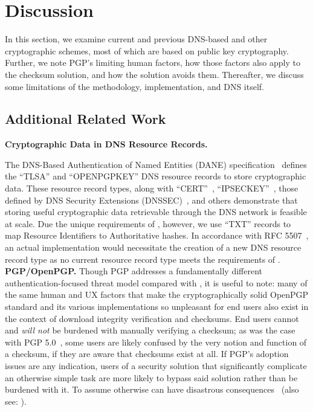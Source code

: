 \section{Discussion} \label{sec:discussion}

In this section, we examine current and previous DNS-based and other
cryptographic schemes, most of which are based on public key cryptography.
Further, we note PGP's limiting human factors, how those factors also apply to
the checksum solution, and how the \SYSTEM{} solution avoids them. Thereafter,
we discuss some limitations of the \SYSTEM{} methodology, implementation, and
DNS itself.

\subsection{Additional Related Work}

\noindent\textbf{Cryptographic Data in DNS Resource Records.}

The DNS-Based Authentication of Named Entities (DANE) specification~\cite{DANE1,
DANE2, DANE3} defines the ``TLSA'' and ``OPENPGPKEY'' DNS resource records to
store cryptographic data. These resource record types, along with
``CERT''~\cite{CERT}, ``IPSECKEY''~\cite{IPSECKEY}, those defined by DNS
Security Extensions (DNSSEC)~\cite{DNSSEC}, and others demonstrate that storing
useful cryptographic data retrievable through the DNS network is feasible at
scale. Due the unique requirements of \SYSTEM{}, however, we use ``TXT'' records
to map Resource Identifiers to Authoritative hashes. In accordance with RFC
5507~\cite{RFC5507}, an actual \SYSTEM{} implementation would necessitate the
creation of a new DNS resource record type as no current resource record type
meets the requirements of \SYSTEM{}. \\

\noindent\textbf{PGP/OpenPGP.} Though PGP addresses a fundamentally different
authentication-focused threat model compared with \SYSTEM{}, it is useful to
note: many of the same human and UX factors that make the cryptographically
solid OpenPGP standard and its various implementations so unpleasant for end
users also exist in the context of download integrity verification and
checksums. End users cannot and \textit{will not} be burdened with manually
verifying a checksum; as was the case with PGP 5.0~\cite{PGPBad}, some users are
likely confused by the very notion and function of a checksum, if they are aware
that checksums exist at all. If PGP's adoption issues are any indication, users
of a security solution that significantly complicate an otherwise simple task
are more likely to bypass said solution rather than be burdened with it. To
assume otherwise can have disastrous consequences~\cite{PGPBad} (also see:
). \\

